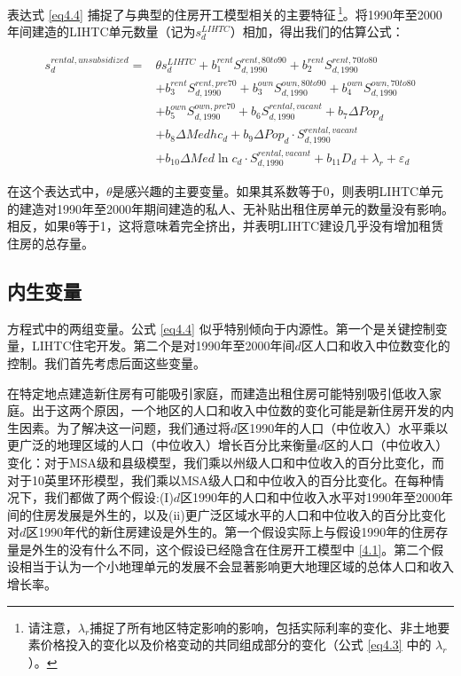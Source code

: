 \documentclass[lang=cn,11pt,a4paper]{paper}
\begin{document}
表达式 \eqref{eq4.4} 捕捉了与典型的住房开工模型相关的主要特征\,\footnote{请注意，$\lambda_{r}$捕捉了所有地区特定影响的影响，包括实际利率的变化、非土地要素价格投入的变化以及价格变动的共同组成部分的变化（公式 \eqref{eq4.3} 中的 $\lambda_{r}$）。}。将1990年至2000年间建造的LIHTC单元数量（记为$s_d^{LIHTC}$）相加，得出我们的估算公式：

\begin{equation}\label{eq4.5}
  \begin{aligned}
    s_{d}^{rental,unsubsidized}=& \theta s_{d}^{LIHTC}+b_{1}^{rent} S_{d, 1990}^{rent, 80 to 90}+b_{2}^{rent} S_{d, 1990}^{rent, 70 t o 80} \\
    &+b_{3}^{rent } S_{d, 1990}^{rent , pre 70}+b_{3}^{own} S_{d, 1990}^{own, 80 to90}+b_{4}^{own } S_{d, 1990}^{own, 70 to 80} \\
    &+b_{5}^{own} S_{d, 1990}^{own,pre70}+b_{6} S_{d, 1990}^{rental,vacant}+b_{7} \Delta P o p_{d} \\
    &+b_{8} \Delta M e d h c_{d}+b_{9} \Delta P o p_{d} \cdot S_{d, 1990}^{rental, vacant} \\
    &+b_{10} \Delta M e d \ln c_{d} \cdot S_{d, 1990}^{rental, vacant}+b_{11} D_{d}+\lambda_{r}+\varepsilon_{d}
    \end{aligned}
\end{equation}
\vspace{3pt}

在这个表达式中，$\theta$是感兴趣的主要变量。如果其系数等于0，则表明LIHTC单元的建造对1990年至2000年期间建造的私人、无补贴出租住房单元的数量没有影响。相反，如果θ等于1，这将意味着完全挤出，并表明LIHTC建设几乎没有增加租赁住房的总存量。

\subsection{内生变量}

方程式中的两组变量。公式 \eqref{eq4.4} 似乎特别倾向于内源性。第一个是关键控制变量，LIHTC住宅开发。第二个是对1990年至2000年间$d$区人口和收入中位数变化的控制。我们首先考虑后面这些变量。

在特定地点建造新住房有可能吸引家庭，而建造出租住房可能特别吸引低收入家庭。出于这两个原因，一个地区的人口和收入中位数的变化可能是新住房开发的内生因素。为了解决这一问题，我们通过将$d$区1990年的人口（中位收入）水平乘以更广泛的地理区域的人口（中位收入）增长百分比来衡量$d$区的人口（中位收入）变化：对于MSA级和县级模型，我们乘以州级人口和中位收入的百分比变化，而对于10英里环形模型，我们乘以MSA级人口和中位收入的百分比变化。在每种情况下，我们都做了两个假设:(I)$d$区1990年的人口和中位收入水平对1990年至2000年间的住房发展是外生的，以及(ii)更广泛区域水平的人口和中位收入的百分比变化对$d$区1990年代的新住房建设是外生的。第一个假设实际上与假设1990年的住房存量是外生的没有什么不同，这个假设已经隐含在住房开工模型中 \eqref{4.1}。第二个假设相当于认为一个小地理单元的发展不会显著影响更大地理区域的总体人口和收入增长率。
\end{document}
